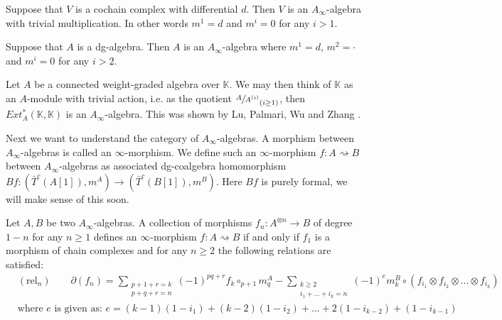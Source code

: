 \documentclass[../thesis.tex]{subfiles}
\begin{document}
        \begin{example}
            Suppose that $V$ is a cochain complex with differential $d$. Then $V$ is an $A_\infty$-algebra with trivial multiplication. In other words $m^1 = d$ and $m^i = 0$ for any $i>1$.
        \end{example}

        \begin{example}
            Suppose that $A$ is a dg-algebra. Then $A$ is an $A_\infty$-algebra where $m^1 = d$, $m^2 = \cdot$ and $m^i=0$ for any $i>2$.
        \end{example}

        \begin{example}
            Let $A$ be a connected weight-graded algebra over $\mathbb{K}$. We may then think of $\mathbb{K}$ as an $A$-module with trivial action, i.e. as the quotient $\sfrac{A}{A^{(i)}}_{(i\geq 1)}$, then $Ext^*_A(\mathbb{K},\mathbb{K})$ is an $A_\infty$-algebra. This was shown by Lu, Palmari, Wu and Zhang \cite{Lu06}.
        \end{example}

        Next we want to understand the category of $A_\infty$-algebras. A morphism between $A_\infty$-algebras is called an $\infty$-morphism. We define such an $\infty$-morphism $f:A\rightsquigarrow B$ between $A_\infty$-algebras as associated dg-coalgebra homomorphism $Bf:(\bar{T}^c(A[1]), m^A)\rightarrow (\bar{T}^c(B[1]), m^B)$. Here $Bf$ is purely formal, we will make sense of this soon.

        \begin{proposition}
            Let $A,B$ be two $A_\infty$-algebras. A collection of morphisms $f_n : A^{\otimes n} \rightarrow B$ of degree $1-n$ for any $n \geq 1$ defines an $\infty$-morphism $f : A \rightsquigarrow B$ if and only if $f_1$ is a morphism of chain complexes and for any $n\geq 2$ the following relations are satisfied:
            \begin{align*}
                & (\text{rel}_n)\qquad \partial(f_n) = \sum_{\substack{p + 1 + r = k \\ p + q + r = n}}(-1)^{pq+r}f_k\circ_{p+1}m^A_q - \sum_{\substack{k\geq 2 \\ i_1 + ... + i_k = n}}(-1)^{e}m^B_k \circ (f_{i_1}\otimes f_{i_2}\otimes ... \otimes f_{i_k}) \\
                & \text{where } e \text{ is given as: } e = (k-1)(1-i_1) + (k-2)(1-i_2) + ... + 2(1-i_{k-2}) + (1-i_{k-1})
            \end{align*}
        \end{proposition}
        
\end{document}

